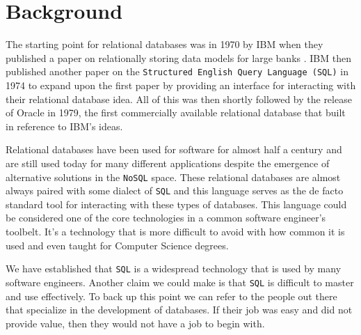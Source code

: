\documentclass[11pt]{article}
\begin{document}



\section{Background}

The starting point for relational databases was in 1970 by IBM when they published a paper on relationally storing data models for large banks \citep{rdbms}. IBM then published another paper on the \texttt{Structured English Query Language (SQL)} \citep{sql} in 1974 to expand upon the first paper by providing an interface for interacting with their relational database idea. All of this was then shortly followed by the release of Oracle in 1979, the first commercially available relational database that built in reference to IBM's ideas.

Relational databases have been used for software for almost half a century and are still used today for many different applications despite the emergence of alternative solutions in the \texttt{NoSQL} space. These relational databases are almost always paired with some dialect of \texttt{SQL} and this language serves as the de facto standard tool for interacting with these types of databases. This language could be considered one of the core technologies in a common software engineer's toolbelt. It's a technology that is more difficult to avoid with how common it is used and even taught for Computer Science degrees.

We have established that \texttt{SQL} is a widespread technology that is used by many software engineers. Another claim we could make is that \texttt{SQL} is difficult to master and use effectively. To back up this point we can refer to the people out there that specialize in the development of databases. If their job was easy and did not provide value, then they would not have a job to begin with.
\end{document}
